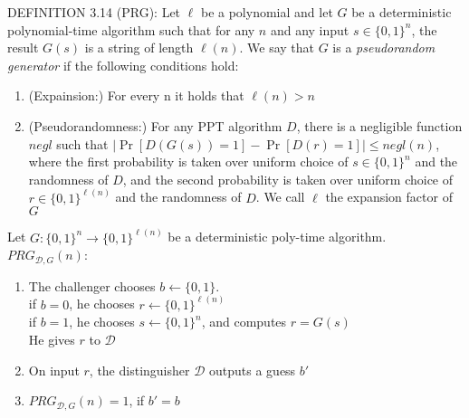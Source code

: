 DEFINITION 3.14 (PRG): Let $\ell$ be a polynomial and let $G$ be a deterministic 
polynomial-time algorithm such that for any $n$ and any input $s \in \{0,1\}^n$, 
the result $G(s)$ is a string of length $\ell(n)$. We say that $G$ is 
a \emph{pseudorandom generator} if the following conditions hold:
\begin{enumerate}
    \item (Expainsion:) For every n it holds that $\ell(n)>n$
    \item (Pseudorandomness:) For any PPT algorithm $D$, there is a negligible
     function $negl$ such that $|\Pr[D(G(s))=1]-\Pr[D(r)=1]|\le negl(n)$,
     where the first probability is taken over uniform choice of
     $s \in \{0, 1\}^n$ and the randomness of $D$, and the second probability
      is taken over uniform choice of $r \in \{0, 1\}^{\ell(n)}$ and the randomness
       of $D$. We call $\ell$ the expansion factor of $G$
\end{enumerate}
Let $G:\{0,1\}^n\rightarrow \{0,1\}^{\ell(n)}$ be a deterministic poly-time
algorithm.\\
$PRG_{\mathcal{D},G}(n)$:
\begin{enumerate}
  \item The challenger chooses $b\leftarrow\{0,1\}$.\\
  if $b=0$, he chooses $r\leftarrow\{0,1\}^{\ell(n)}$\\
  if $b=1$, he chooses $s\leftarrow\{0,1\}^n$, and computes $r=G(s)$\\
  He gives $r$ to $\mathcal{D}$
  \item On input $r$, the distinguisher $\mathcal{D}$ outputs a guess $b'$
  \item $PRG_{\mathcal{D},G}(n)=1$, if $b'=b$
\end{enumerate}

